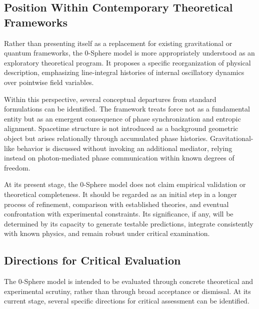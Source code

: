 \documentclass[12pt,letterpaper]{article}
\begin{document}

\subsection{Position Within Contemporary Theoretical Frameworks}
\label{subsec:position}

Rather than presenting itself as a replacement for existing gravitational or quantum frameworks, the 0-Sphere model is more appropriately understood as an exploratory theoretical program. It proposes a specific reorganization of physical description, emphasizing line-integral histories of internal oscillatory dynamics over pointwise field variables.

Within this perspective, several conceptual departures from standard formulations can be identified. The framework treats force not as a fundamental entity but as an emergent consequence of phase synchronization and entropic alignment. Spacetime structure is not introduced as a background geometric object but arises relationally through accumulated phase histories. Gravitational-like behavior is discussed without invoking an additional mediator, relying instead on photon-mediated phase communication within known degrees of freedom.

At its present stage, the 0-Sphere model does not claim empirical validation or theoretical completeness. It should be regarded as an initial step in a longer process of refinement, comparison with established theories, and eventual confrontation with experimental constraints. Its significance, if any, will be determined by its capacity to generate testable predictions, integrate consistently with known physics, and remain robust under critical examination.


\subsection{Directions for Critical Evaluation}
\label{subsec:critical_evaluation}

The 0-Sphere model is intended to be evaluated through concrete theoretical and experimental scrutiny, rather than through broad acceptance or dismissal. At its current stage, several specific directions for critical assessment can be identified.
\end{document}
